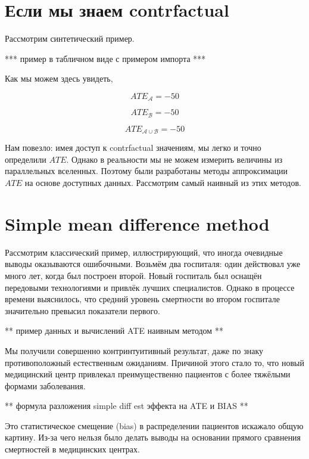 \documentclass{article}
\begin{document}
    \section*{Если мы знаем contrfactual}

        Рассмотрим синтетический пример.

        *** пример в табличном виде с примером импорта ***



        Как мы можем здесь увидеть,

        \[ATE_{\mathcal{A}} = -50\]

        \[ATE_{\mathcal{B}} = -50\]

        \[ATE_{\mathcal{A} \cup \mathcal{B}} = -50\]

        Нам повезло: имея доступ к contrfactual значениям, мы легко и точно определили $ATE$.
        Однако в реальности мы не можем измерить величины из параллельных вселенных.
        Поэтому были разработаны методы аппроксимации $ATE$ на основе доступных данных.
        Рассмотрим самый наивный из этих методов.

    \section*{Simple mean difference method}

        Рассмотрим классический пример, иллюстрирующий, что иногда очевидные выводы оказываются ошибочными.
        Возьмём два госпиталя: один действовал уже много лет, когда был построен второй.
        Новый госпиталь был оснащён передовыми технологиями и привлёк лучших специалистов.
        Однако в процессе времени выяснилось, что средний уровень смертности во втором госпитале значительно превысил показатели первого.


        ** пример данных и вычислений ATE наивным методом **


        Мы получили совершенно контринтуитивный результат, даже по знаку противоположный естественным ожиданиям.
        Причиной этого стало то, что новый медицинский центр привлекал преимущественно пациентов с более тяжёлыми формами заболевания.

        ** формула разложения simple diff est эффекта на ATE и BIAS **

        Это статистическое смещение (bias) в распределении пациентов искажало общую картину.
        Из-за чего нельзя было делать выводы на основании прямого сравнения смертностей в медицинских центрах.
\end{document}
